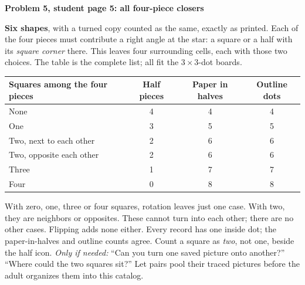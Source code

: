 \documentclass[11pt]{article}
\newcommand{\sub}[1]{\par\textbf{#1}\par}
\newcommand{\hint}[1]{\textit{Only if needed:} #1}
\newcommand{\closer}[4]{%
  \foreach \r/\full in {0/#1,90/#2,180/#3,270/#4}{%
    \begin{scope}[rotate=\r]
      \ifnum\full=1\filldraw[fill=gray!18] (0,0) rectangle (1,1);
      \else\filldraw[fill=gray!18] (0,0)--(1,0)--(0,1)--cycle;\fi
    \end{scope}}
  \foreach \x in {-1,0,1}{\foreach \y in {-1,0,1}{\fill (\x,\y) circle (1.1pt);}}
  \draw (-.13,-.13) rectangle (.13,.13);}
\begin{document}
\sub{Problem 5, student page 5: all four-piece closers}
\textbf{Six shapes}, with a turned copy counted as the same, exactly as printed. Each of the four pieces must contribute a right angle at the star: a square or a half with its \emph{square corner} there. This leaves four surrounding cells, each with those two choices. The table is the complete list; all fit the $3\times3$-dot boards.
\begin{center}
\renewcommand{\arraystretch}{1.16}
\begin{tabular}{lccc}
Squares among the four pieces & Half pieces & Paper in halves & Outline dots\\\midrule
None & 4 & 4 & 4\\
One & 3 & 5 & 5\\
Two, next to each other & 2 & 6 & 6\\
Two, opposite each other & 2 & 6 & 6\\
Three & 1 & 7 & 7\\
Four & 0 & 8 & 8
\end{tabular}

\vspace{3mm}
\end{center}
With zero, one, three or four squares, rotation leaves just one case. With two, they are neighbors or opposites. These cannot turn into each other; there are no other cases. Flipping adds none either. Every record has one inside dot; the paper-in-halves and outline counts agree. Count a square as \emph{two}, not one, beside the half icon. \hint{``Can you turn one saved picture onto another?'' ``Where could the two squares sit?''} Let pairs pool their traced pictures before the adult organizes them into this catalog.
\end{document}
